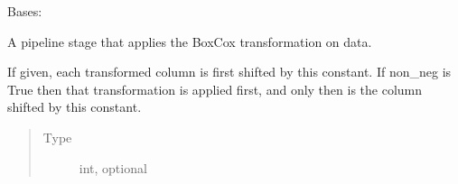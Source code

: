 \documentclass[letterpaper,10pt,english]{sphinxmanual}
\begin{document}
\begin{fulllineitems}
\label{\detokenize{dalio.pipe:dalio.pipe.BoxCox}}
Bases: {\hyperref[\detokenize{dalio.pipe:dalio.pipe.col_generation.Custom}]{}}

A pipeline stage that applies the BoxCox transformation on data.

\begin{fulllineitems}
\label{\detokenize{dalio.pipe:dalio.pipe.BoxCox.const_shift}}
If given, each transformed column is
first shifted by this constant. If non\_neg is True then that
transformation is applied first, and only then is the column
shifted by this constant.
\begin{quote}\begin{description}
\item[{Type}] \leavevmode
int, optional

\end{description}\end{quote}

\end{fulllineitems}


\end{fulllineitems}

\end{document}
